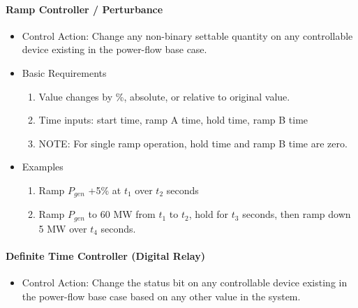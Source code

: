 \documentclass[12pt]{article}
\newcommand{\q}{(\textit{\textbf{?}})}
\begin{document}
\begin{multicols*}{2}
\paragraph{Ramp Controller / Perturbance}
\begin{itemize}
	\item Control Action: Change any non-binary settable quantity on any controllable device existing in the power-flow base case.
	\item Basic Requirements
	\begin{enumerate}
		\item Value changes by \%, absolute, or relative to original value.
		\item Time inputs: start time, ramp A time, hold time, ramp B time
		\item NOTE: For single ramp operation, hold time and ramp B time are zero.
	\end{enumerate}
	\item Examples
	\begin{enumerate}
	\item Ramp $P_{gen}$ +5\% at $t_1$ over $t_2$ seconds
	\item Ramp $P_{gen}$ to 60 MW from $t_1$ to $t_2$, hold for $t_3$ seconds, then ramp down 5 MW over $t_4$ seconds.
	\end{enumerate}	
	
\end{itemize}

\vfill\null
\columnbreak
%
\vspace{0pt}
\paragraph{Definite Time Controller (Digital Relay)}
\begin{itemize}
	\item Control Action: Change the status bit on any controllable device existing in the power-flow base case based on any other value in the system.
	

\end{itemize}
\end{multicols*}
\end{document}
